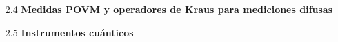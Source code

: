 \documentclass[12pt,oneside]{book}\raggedbottom{} %
\begin{document}
\begin{sloppypar}
{{\begin{itemize}
\begin{itemize}



  \item[2.3.2] \textbf{Valores esperado en sistemas cuánticos} 
  
  
\end{itemize}




  \item[2.4]\textbf{Medidas POVM y operadores de Kraus para mediciones difusas}

  
  
  \item[2.5]  \textbf{Instrumentos cuánticos} 
\end{itemize}


}}
\end{sloppypar}
\end{document}
